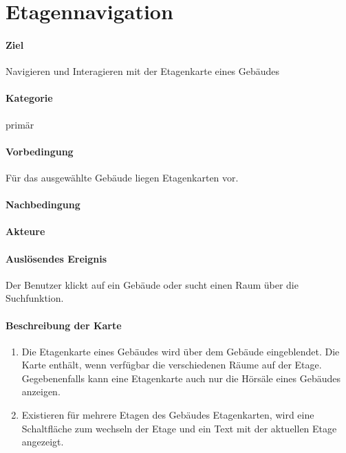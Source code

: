\section{Etagennavigation}
\paragraph{Ziel}
Navigieren und Interagieren mit der Etagenkarte eines Gebäudes
\paragraph{Kategorie}
primär
\paragraph{Vorbedingung}
Für das ausgewählte Gebäude liegen Etagenkarten vor.
\paragraph{Nachbedingung}

\paragraph{Akteure}

\paragraph{Auslösendes Ereignis}
Der Benutzer klickt auf ein Gebäude oder sucht einen Raum über die Suchfunktion.
\paragraph{Beschreibung der Karte}
\begin{enumerate}
    \item Die Etagenkarte eines Gebäudes wird über dem Gebäude eingeblendet. Die Karte enthält, wenn verfügbar die verschiedenen Räume auf der Etage. Gegebenenfalls kann eine Etagenkarte auch nur die Hörsäle eines Gebäudes anzeigen.
    \item Existieren für mehrere Etagen des Gebäudes Etagenkarten, wird eine Schaltfläche zum wechseln der Etage und ein Text mit der aktuellen Etage angezeigt.
\end{enumerate}
